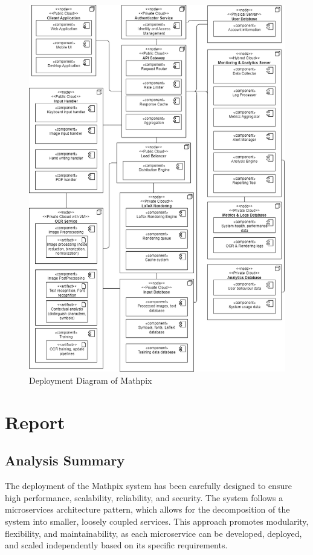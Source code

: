 \documentclass{article}
\begin{document}
\begin{figure}[H]
    \centering
    \includegraphics[width=\textwidth]{deployment_diagram.png}
    \caption{Deployment Diagram of Mathpix}
    \label{fig:Deployment Diagram of Mathpix}
\end{figure}

\section{Report}
\subsection{Analysis Summary}
The deployment of the Mathpix system has been carefully designed to ensure high performance, scalability, reliability, and security. The system follows a microservices architecture pattern, which allows for the decomposition of the system into smaller, loosely coupled services. This approach promotes modularity, flexibility, and maintainability, as each microservice can be developed, deployed, and scaled independently based on its specific requirements.
\end{document}
